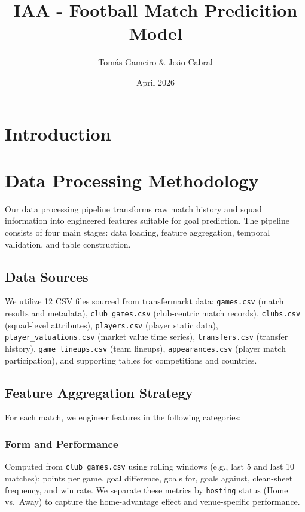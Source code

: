 \documentclass{article}
\title{IAA - Football Match Predicition Model}
\author{Tomás Gameiro \& João Cabral}
\date{April 2026}
\begin{document}
\maketitle

\section{Introduction}

\section{Data Processing Methodology}

Our data processing pipeline transforms raw match history and squad information into engineered features suitable for goal prediction. The pipeline consists of four main stages: data loading, feature aggregation, temporal validation, and table construction.

\subsection{Data Sources}

We utilize 12 CSV files sourced from transfermarkt data: \texttt{games.csv} (match results and metadata), \texttt{club\_games.csv} (club-centric match records), \texttt{clubs.csv} (squad-level attributes), \texttt{players.csv} (player static data), \texttt{player\_valuations.csv} (market value time series), \texttt{transfers.csv} (transfer history), \texttt{game\_lineups.csv} (team lineups), \texttt{appearances.csv} (player match participation), and supporting tables for competitions and countries.

\subsection{Feature Aggregation Strategy}

For each match, we engineer features in the following categories:

\subsubsection{Form and Performance}
Computed from \texttt{club\_games.csv} using rolling windows (e.g., last 5 and last 10 matches): points per game, goal difference, goals for, goals against, clean-sheet frequency, and win rate. We separate these metrics by \texttt{hosting} status (Home vs.\ Away) to capture the home-advantage effect and venue-specific performance.
\end{document}
